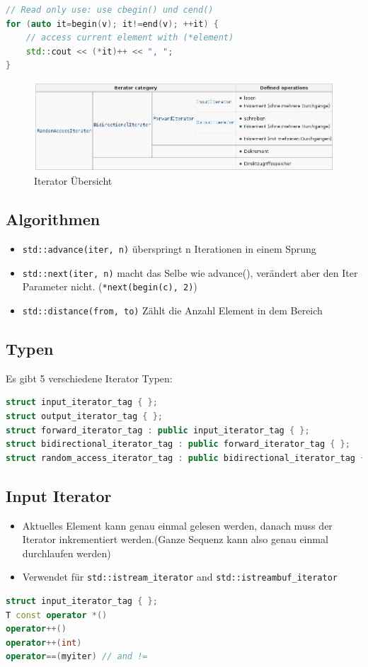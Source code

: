 \begin{lstlisting}[language=C++]
// Read only use: use cbegin() und cend()
for (auto it=begin(v); it!=end(v); ++it) {
	// access current element with (*element)
	std::cout << (*it)++ << ", ";
}
\end{lstlisting}

\begin{figure}[h!]
	\centering
	\includegraphics[width=0.9\linewidth]{images/iterator_overview}
	\caption{Iterator Übersicht}
	\label{fig:iteratoroverview}
\end{figure}


\subsection{Algorithmen}
\begin{itemize}
	\item \lstinline|std::advance(iter, n)| überspringt n Iterationen in einem Sprung
	\item \lstinline|std::next(iter, n)| macht das Selbe wie advance(), verändert aber den Iter Parameter nicht. (\lstinline|*next(begin(c), 2)|)
	\item \lstinline|std::distance(from, to)| Zählt die Anzahl Element in dem Bereich
\end{itemize}

\subsection{Typen}
Es gibt 5 verschiedene Iterator Typen:
\begin{lstlisting}[language=C++]
struct input_iterator_tag { };
struct output_iterator_tag { };
struct forward_iterator_tag : public input_iterator_tag { };
struct bidirectional_iterator_tag : public forward_iterator_tag { };
struct random_access_iterator_tag : public bidirectional_iterator_tag { };
\end{lstlisting}

\clearpage

\subsection{Input Iterator}
\begin{itemize}
	\item Aktuelles Element kann genau einmal gelesen werden, danach muss der Iterator inkrementiert werden.(Ganze Sequenz kann also genau einmal durchlaufen werden)
	\item Verwendet für \lstinline|std::istream_iterator| and \lstinline|std::istreambuf_iterator|
\end{itemize}
\begin{lstlisting}[language=C++]
struct input_iterator_tag { };
T const operator *()
operator++()
operator++(int)
operator==(myiter) // and !=
\end{lstlisting}

